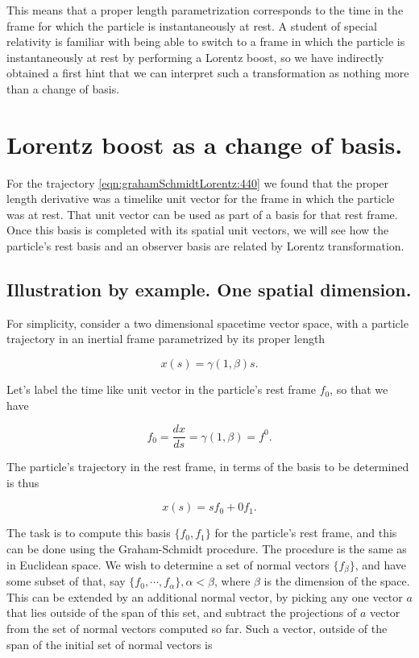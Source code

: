 \documentclass[iop,tighten]{emulateapj}
\begin{document}
This means that a proper length parametrization corresponds to the time in the frame for which the particle is instantaneously at rest.  A student of special relativity is familiar with being able to switch to a frame in which the particle is instantaneously at rest by performing a Lorentz boost, so we have indirectly obtained a first hint that we can interpret such a transformation as nothing more than a change of basis.

\section{Lorentz boost as a change of basis.}

For the trajectory \ref{eqn:grahamSchmidtLorentz:440} we found that the proper length derivative was a timelike unit vector for the frame in which the particle was at rest.  That unit vector can be used as part of a basis for that rest frame.  Once this basis is completed with its spatial unit vectors, we will see how the particle's rest basis and an observer basis are related by Lorentz transformation.

\subsection{Illustration by example.  One spatial dimension.}

For simplicity, consider a two dimensional spacetime vector space, with a particle trajectory in an inertial frame parametrized by its proper length

\begin{equation}\label{eqn:grahamSchmidtLorentz:600}
x(s) = \gamma (1, \beta) s.
\end{equation}

Let's label the time like unit vector in the particle's rest frame $f_0$, so that we have

\begin{equation}\label{eqn:grahamSchmidtLorentz:620}
f_0 = \frac{dx}{ds} = \gamma (1, \beta) = f^0.
\end{equation}

The particle's trajectory in the rest frame, in terms of the basis to be determined is thus

\begin{equation}\label{eqn:grahamSchmidtLorentz:640}
x(s) = s f_0 + 0 f_1.
\end{equation}

The task is to compute this basis $\{f_0, f_1\}$ for the particle's rest frame, and this can be done using the Graham-Schmidt procedure.  The procedure is the same as in Euclidean space.  We wish to determine a set of normal vectors $\{f_\beta\}$, and have some subset of that, say $\{f_0, \cdots, f_\alpha\}, \alpha < \beta$, where $\beta$ is the dimension of the space.  This can be extended by an additional normal vector, by picking any one vector $a$ that lies outside of the span of this set, and subtract the projections of $a$ vector from the set of normal vectors computed so far.  Such a vector, outside of the span of the initial set of normal vectors is
\end{document}
